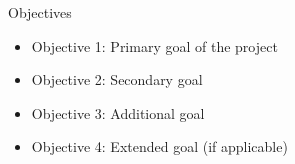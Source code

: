 
\begin{frame}{Objectives}
    \begin{center}
    \end{center}
    \vspace{0.5em}
    \begin{itemize}
        \item Objective 1: Primary goal of the project
        \item Objective 2: Secondary goal
        \item Objective 3: Additional goal
        \item Objective 4: Extended goal (if applicable)
    \end{itemize}
\end{frame}
